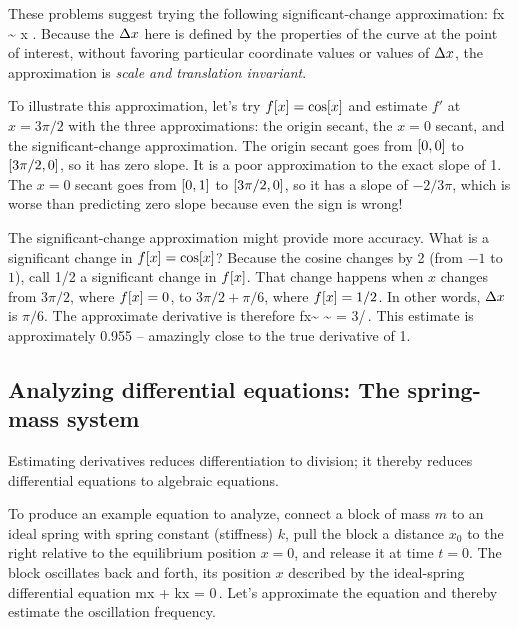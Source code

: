 These problems suggest trying the following significant-change approximation:
\beq
\xod fx \sim {}
                   {\diff x\,}\,.
\eeq
Because the $\Delta x$ here is defined by the properties of the curve at the point of interest, without favoring particular coordinate values or values of $\Delta x$, the approximation is \emph{scale and translation invariant}.

To illustrate this approximation, let's try $f\!\left[{x}\right] = \cos\!\left[{x}\right]$ and estimate $f'$ at $x = 3\pi/2$ with the three approximations: the origin secant, the $x = 0$ secant, and the significant-change approximation. The origin secant goes from $\left[{0,0}\right]$ to $\left[{3\pi/2,0}\right]$, so it has zero slope. It is a poor approximation to the exact slope of 1. The $x = 0$ secant goes from $\left[{0,1}\right]$ to $\left[{3\pi/2,0}\right]$, so it has a slope of $-2/3\pi$, which is worse than predicting zero slope because even the sign is wrong!

The significant-change approximation might provide more accuracy. What is a significant change in $f\!\left[{x}\right] = \cos\!\left[{x}\right]$? Because the cosine changes by 2 (from $-1$ to $1$), call 1/2 a significant change in $f\!\left[{x}\right]$. That change happens when $x$ changes from $3\pi/2$, where $f\!\left[{x}\right] = 0$, to $3\pi/2 + \pi/6$, where $f\!\left[{x}\right] = 1/2$. In other words, $\Delta x$ is $\pi/6$. The approximate derivative is therefore
\beq
\xod fx\sim {}
        \sim {} = 3/\pi\,.
\eeq
This estimate is approximately 0.955 -- amazingly close to the true derivative of 1.


\subsection{Analyzing differential equations: The spring-mass system}
Estimating derivatives reduces differentiation to division; it thereby reduces differential equations to algebraic equations.

To produce an example equation to analyze, connect a block of mass $m$ to an ideal spring with spring constant (stiffness) $k$, pull the block a distance $x_0$ to the right relative to the equilibrium position $x = 0$, and release it at time $t = 0$. The block oscillates back and forth, its position $x$ described by the ideal-spring differential equation
\beq
m\ddt x + kx = 0\,.
\eeq
Let's approximate the equation and thereby estimate the oscillation frequency.


